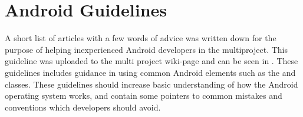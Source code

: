 
\section{Android Guidelines}
A short list of articles with a few words of advice was written down for the purpose of helping inexperienced Android developers in the multiproject. This guideline was uploaded to the multi project wiki-page and can be seen in . These guidelines includes guidance in using common Android elements such as the  and  classes. These guidelines should increase basic understanding of how the Android operating system works, and contain some pointers to common mistakes and conventions which developers should avoid.
